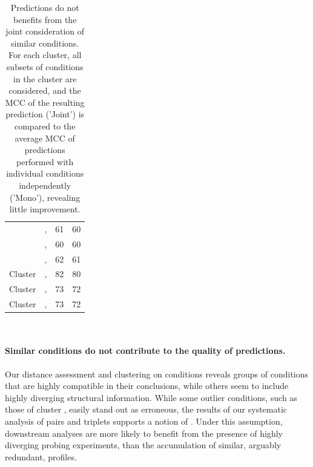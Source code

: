 \documentclass[a4,center,fleqn]{NAR}
\begin{document}
\begin{table}[ht]
{\begin{adjustbox}{max width=\linewidth}
\begin{tabular}{@{}llHH@{}}
				& \BzCN, \OneMSevCE                                & 61                  & 60                      \\
				& \BzCN, \NMIACE                                & 60                  & 60                      \\
				& \OneMSevCE, \NMIACE                              & 62                  & 61                      \\ \midrule
				{Cluster }                         & \OneMSevILUMg, \OneMSevILUThreeMg                        & 82                  & 80                      \\ \midrule
				{Cluster } & \OneMSevMgCE, \NMIAMgCE                          & 73                  & 72                      \\ \midrule
				{Cluster }                         & \NAIMg, \CMCTMg                              & 73                  & 72                      \\ \bottomrule
			\end{tabular}
		\end{adjustbox}
		\\}
	\caption{Predictions do not benefits from the joint consideration of similar conditions. For each cluster, all subsets of conditions in the cluster are considered, and the MCC of the resulting prediction ('Joint') is compared to the average MCC of predictions performed with individual conditions independently ('Mono'), revealing little improvement.}\label{fig:similarconds}
\end{table}

\paragraph{Similar conditions do not contribute to the quality of predictions.} 
Our distance assessment and clustering on conditions reveals groups of conditions that are highly compatible in their conclusions, while others seem to include highly diverging structural information. While some outlier conditions, such as those of cluster , easily stand out as erroneous, the results of our systematic analysis of pairs and triplets supports a notion of . Under this assumption, downstream analyses are more likely to benefit from the presence of highly diverging probing experiments, than the accumulation of similar, arguably redundant, profiles. 
\end{document}
